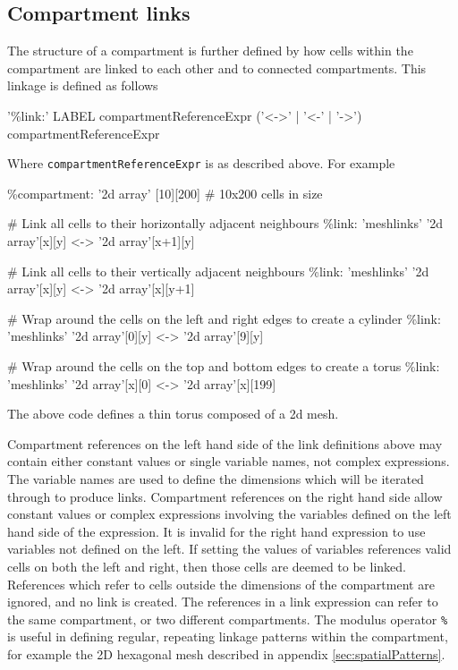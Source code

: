\subsection{Compartment links}

The structure of a compartment is further defined by how cells within the compartment are linked to each other and to connected compartments. This linkage is defined as follows
\begin{bnfsource}
'\%link:' LABEL compartmentReferenceExpr ('<->' | '<-' | '->') compartmentReferenceExpr
\end{bnfsource}
Where \verb|compartmentReferenceExpr| is as described above. For example
\begin{kappasource}
\%compartment: '2d array' [10][200]    # 10x200 cells in size 

# Link all cells to their horizontally adjacent neighbours
\%link: 'meshlinks' '2d array'[x][y] <-> '2d array'[x+1][y]

# Link all cells to their vertically adjacent neighbours
\%link: 'meshlinks' '2d array'[x][y] <-> '2d array'[x][y+1]

# Wrap around the cells on the left and right edges to create a cylinder
\%link: 'meshlinks' '2d array'[0][y] <-> '2d array'[9][y]

# Wrap around the cells on the top and bottom edges to create a torus
\%link: 'meshlinks' '2d array'[x][0] <-> '2d array'[x][199]
\end{kappasource}

The above code defines a thin torus composed of a 2d mesh.

Compartment references on the left hand side of the link definitions above may contain either constant values or single variable names, not complex expressions. The variable names are used to define the dimensions which will be iterated through to produce links. Compartment references on the right hand side allow constant values or complex expressions involving the variables defined on the left hand side of the expression. It is invalid for the right hand expression to use variables not defined on the left. If setting the values of variables references valid cells on both the left and right, then those cells are deemed to be linked. References which refer to cells outside the dimensions of the compartment are ignored, and no link is created. The references in a link expression can refer to the same compartment, or two different compartments. The modulus operator \verb|%| is useful in defining regular, repeating linkage patterns within the compartment, for example the 2D hexagonal mesh described in appendix \ref{sec:spatialPatterns}.

